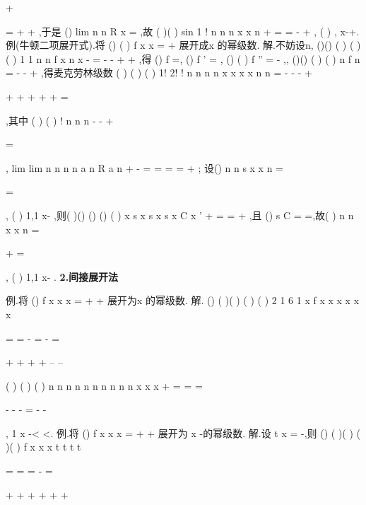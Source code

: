 +




=
\le 
+
+
,于是
()
lim
n
n
R
x
\to \infty 
=
,故 
(
)(
)
sin
1 !
n
n
n
x
x
n
+
\infty 
=
=
-
+
\sum 
,
(
)
,
x\in -\infty +\infty . 
\textcolor{lyred}{例(牛顿二项展开式)}.将
()
(
)
f x
x
\alpha 
=
+
展开成x 的幂级数. 
解.不妨设n\notin \infty ,
()()
(
)
(
)(
)
1 1
n
n
f
x
n
x
\alpha 
\alpha \alpha 
\alpha 
-
=
-
-
+
+
\Lambda 
,得
()
f
=, 
()
f
\alpha 
'
=
,
()
(
)
f
\alpha \alpha 
''
=
-
,\Lambda ,
()()
(
)
(
)
n
f
n
\alpha \alpha 
\alpha 
=
-
-
+
\Lambda 
,得麦克劳林级数 
(
)
(
)
(
)
1!
2!
!
n
n
n
n
x
x
x
x
n
n
\alpha 
\alpha \alpha 
\alpha \alpha 
\alpha 
\alpha 
\infty 
=
-
-
-
+


+
\cdots +
+
+
+
=
\cdots 




\sum 
\Lambda 
\Lambda 
\Lambda 
,其中 
(
)
(
)
!
n
n
n
\alpha 
\alpha \alpha 
\alpha 
-
-
+

=




\Lambda 
,
lim
lim
n
n
n
n
a
n
R
a
n
\alpha 
\rho 
+
\to \infty 
\to \infty 
-
=
=
=\Rightarrow 
=
+
; 
设()
n
n
s x
x
n
\alpha 
\infty 
=


=
\cdots 




\sum 
,
(
)
1,1
x\in -
,则(
)()
()
()
(
)
x s x
s x
s x
C
x
\alpha 
\alpha 
'
+
=
\Rightarrow 
=
+
,且 
()
s
C
=\Rightarrow 
=,故(
)
n
n
x
x
n
\alpha 
\alpha 
\infty 
=


+
=
\cdots 




\sum 
,
(
)
1,1
x\in -
. 
{\bfseries \textcolor{lyred}{2.间接展开法}}

\textcolor{lyred}{例}.将
()
f x
x
x
=
+
+
展开为x 的幂级数. 
解.
()
(
)(
)
(
)
(
)
2 1
6 1
x
f x
x
x
x
x
x


=
=
-
=
\cdots 
-
\cdots 
=


+
+
+
+
--
--


(
)
(
)
(
)
n
n
n
n
n
n
n
n
n
n
x
x
x
\infty 
\infty 
\infty 
+
=
=
=




-
-
-
=
-
-








\sum 
\sum 
\sum 
, 1
x
-<
<. 
\textcolor{lyred}{例}.将
()
f x
x
x
=
+
+
展开为
x -的幂级数. 
解.设
t
x
=
-,则
()
(
)(
)
(
)(
)
f x
x
x
t
t
t
t


=
=
=
-
=


+
+
+
+
+
+


